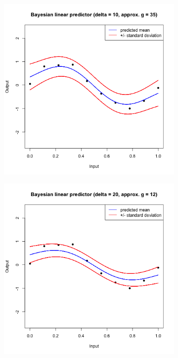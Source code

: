 \documentclass[a4paper, 11pt]{article}
\begin{document}
\begin{figure}[H]
\centering
\begin{subfigure}{.5\textwidth}
  \centering
  \includegraphics[width=1\linewidth]{ps3F_plot8.png}
\end{subfigure}%
\begin{subfigure}{.5\textwidth}
  \centering
  \includegraphics[width=1\linewidth]{ps3F_plot9.png}
\end{subfigure}
\end{figure}
\end{document}
